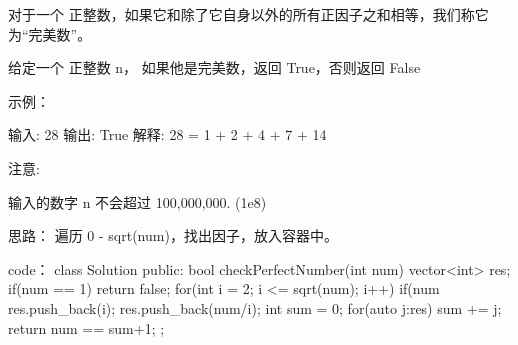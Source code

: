 对于一个 正整数，如果它和除了它自身以外的所有正因子之和相等，我们称它为“完美数”。

给定一个 正整数 n， 如果他是完美数，返回 True，否则返回 False

 

示例：

输入: 28
输出: True
解释: 28 = 1 + 2 + 4 + 7 + 14

 

注意:

输入的数字 n 不会超过 100,000,000. (1e8)

































思路：
遍历 0 - sqrt(num)，找出因子，放入容器中。






























code：
class Solution {
public:
    bool checkPerfectNumber(int num) {
        vector<int> res;
        if(num == 1) return false;
        for(int i = 2; i <= sqrt(num); i++)
        {
            if(num %
            {
                res.push_back(i);
                res.push_back(num/i);
            }
        }
        int sum = 0;
        for(auto j:res)
            sum += j;
        return num == sum+1;
    }
};